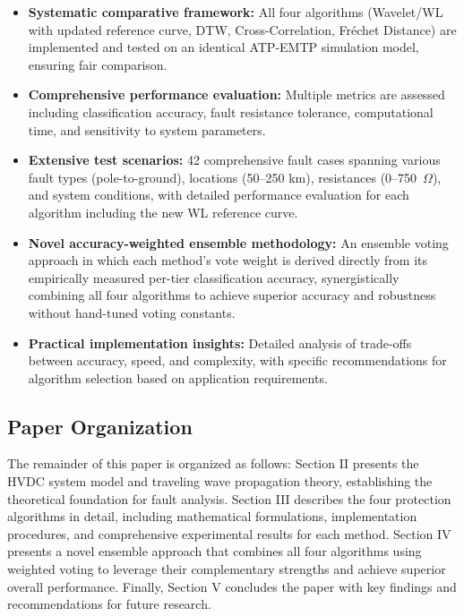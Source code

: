 \documentclass[journal]{IEEEtran}
\begin{document}
\begin{itemize}
    \item \textbf{Systematic comparative framework:} All four algorithms (Wavelet/WL with updated reference curve, DTW, Cross-Correlation, Fréchet Distance) are implemented and tested on an identical ATP-EMTP simulation model, ensuring fair comparison.
    
    \item \textbf{Comprehensive performance evaluation:} Multiple metrics are assessed including classification accuracy, fault resistance tolerance, computational time, and sensitivity to system parameters.
    
    \item \textbf{Extensive test scenarios:} 42 comprehensive fault cases spanning various fault types (pole-to-ground), locations (50--250 km), resistances (0--750~$\Omega$), and system conditions, with detailed performance evaluation for each algorithm including the new WL reference curve.

    \item \textbf{Novel accuracy-weighted ensemble methodology:} An
ensemble voting approach in which each method's vote weight is derived
directly from its empirically measured per-tier classification accuracy,
synergistically combining all four algorithms to achieve superior
accuracy and robustness without hand-tuned voting constants.
    
    \item \textbf{Practical implementation insights:} Detailed analysis of trade-offs between accuracy, speed, and complexity, with specific recommendations for algorithm selection based on application requirements.
    
\end{itemize}

\subsection{Paper Organization}

The remainder of this paper is organized as follows: Section II presents the HVDC system model and traveling wave propagation theory, establishing the theoretical foundation for fault analysis. Section III describes the four protection algorithms in detail, including mathematical formulations, implementation procedures, and comprehensive experimental results for each method. Section IV presents a novel ensemble approach that combines all four algorithms using weighted voting to leverage their complementary strengths and achieve superior overall performance. Finally, Section V concludes the paper with key findings and recommendations for future research.
\end{document}
